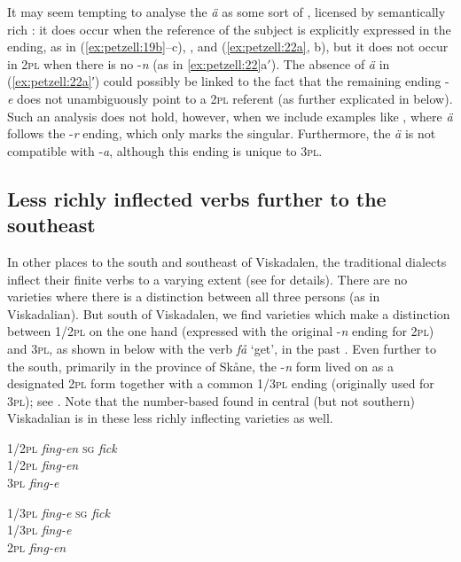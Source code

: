 \documentclass[output=paper,colorlinks,citecolor=brown,draft,draftmode]{langscibook}
\begin{document}
It may seem tempting to analyse the \textit{ä} as some sort of , licensed by semantically rich : it does occur when the reference of the subject is explicitly expressed in the ending, as in (\ref{ex:petzell:19b}–c), , and (\ref{ex:petzell:22a}, b), but it does not occur in 2\textsc{pl} when there is no -\textit{n} (as in \ref{ex:petzell:22}a$'$). The absence of \textit{ä} in (\ref{ex:petzell:22a}′) could possibly be linked to the fact that the remaining ending -\textit{e} does not unambiguously point to a 2\textsc{pl} referent (as further explicated in  below). Such an analysis does not hold, however, when we include examples like , where \textit{ä} follows the -\textit{r} ending, which only marks the singular. Furthermore, the \textit{ä} is not compatible with -\textit{a}, although this ending is unique to 3\textsc{pl}.


\subsection{Less richly inflected verbs further to the southeast}\label{sec:petzell:3.2}


In other places to the south and southeast of Viskadalen, the traditional dialects inflect their finite verbs to a varying extent (see \citealt{Horn2015,Horn2017} for details). There are no varieties where there is a distinction between all three persons (as in Viskadalian). But south of Viskadalen, we find varieties which make a distinction between 1/2\textsc{pl} on the one hand (expressed with the original -\textit{n} ending for 2\textsc{pl}) and 3\textsc{pl}, as shown in  below with the verb \textit{få} ‘get’, in the past . Even further to the south, primarily in the province of Skåne, the -\textit{n} form lived on as a designated 2\textsc{pl} form together with a common 1/3\textsc{pl} ending (originally used for 3\textsc{pl}); see . Note that the number-based  found in central (but not southern) Viskadalian is  in these less richly inflecting varieties as well.

\ea\label{ex:petzell:23}
\begin{multicols}{2}
\ea \label{ex:petzell:23a}\begin{tabbing}
    1/2\textsc{pl}  \=   \textit{fing-en}  \kill
    \textsc{sg}     \> \textit{fick}\\                          
    1/2\textsc{pl}  \>  \textit{fing-en}\\
    3\textsc{pl}    \>    \textit{fing-e}
    \end{tabbing}
\ex \label{ex:petzell:23b}\begin{tabbing}
   1/3\textsc{pl} \= \textit{fing-e}\kill
   \textsc{sg}    \> \textit{fick}\\
   1/3\textsc{pl} \> \textit{fing-e}\\
   2\textsc{pl}   \> \textit{fing-en}
   \end{tabbing}
\z
\end{multicols}
\z
\end{document}
